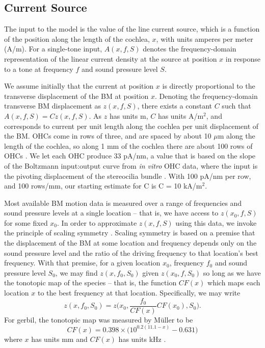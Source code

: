 \documentclass{biophys-new}
\begin{document}
\subsection{Current Source}
\par{The input to the model is the value of the line current source, which is a function of the position along the length of the cochlea, $x$, with units amperes per meter (A/m). For a single-tone input, $A(x,f,S)$ denotes the frequency-domain representation of the linear current density at the source at position $x$ in response to a tone at frequency $f$ and sound pressure level $S$.}
\par{We assume initially that the current at position $x$ is directly proportional to the transverse displacement of the BM at position $x$. Denoting the frequency-domain transverse BM displacement as $z(x,f,S)$, there exists a constant $C$ such that $A(x,f,S) = Cz(x,f,S)$. As $z$ has units m, $C$ has units A/m$ ^2$, and corresponds to current per unit length along the cochlea per unit displacement of the BM. OHCs come in rows of three, and are spaced by about 10 $\mu$m along the length of the cochlea, so along 1 mm of the cochlea there are about 100 rows of OHCs \cite{risoud}. We let each OHC produce 33 pA/nm, a value that is based on the slope of the Boltzmann input:output curve from \textit{in vitro} OHC data, where the input is the pivoting displacement of the stereocilia bundle \cite{he_jia_dallos_2004}. With 100 pA/nm per row, and 100 rows/mm, our starting estimate for C is C = 10 kA/m$ ^2$.}
\par{Most available BM motion data is measured over a range of frequencies and sound pressure levels at a single location -- that is, we have access to $z(x_0,f,S)$ for some fixed $x_0$. In order to approximate $z(x,f,S)$ using this data, we invoke the principle of scaling symmetry \cite{Zweig,zweig_1976,sondhi_1978,olson2020}.  Scaling symmetry is based on a premise that the displacement of the BM at some location and frequency depends only on the sound pressure level and the ratio of the driving frequency to that location's best frequency. With that premise, for a given location $x_0$, frequency $f_0$ and sound pressure level $S_0$, we may find $z(x,f_0,S_0)$ given $z(x_0,f,S_0)$ so long as we have the tonotopic map of the species -- that is, the function $CF(x)$ which maps each location $x$ to the best frequency at that location. Specifically, we may write
\begin{equation}z(x,f_0,S_0) = z\bigg(x_0,\frac{f_0}{CF(x)}CF(x_0),S_0\bigg).
\end{equation}
For gerbil, the tonotopic map was measured by M\"uller to be
\begin{equation}CF(x) = 0.398\times \bigg(10^{0.2(11.1-x)}-0.631\bigg)\end{equation}
where $x$ has units mm and $CF(x)$ has units kHz \cite{muller}.}  
\end{document}
